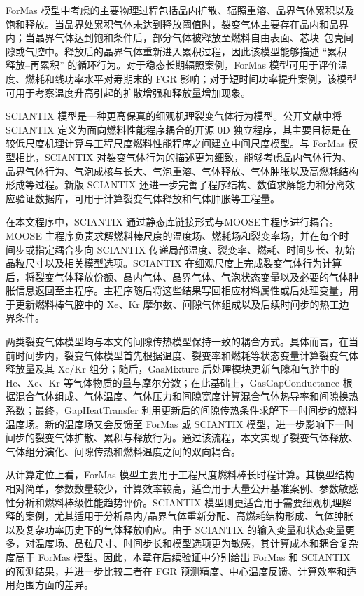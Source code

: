 ForMas 模型中考虑的主要物理过程包括晶内扩散、辐照重溶、晶界气体累积以及饱和释放。当晶界处累积气体未达到释放阈值时，裂变气体主要存在晶内和晶界内；当晶界气体达到饱和条件后，部分气体被释放至燃料自由表面、芯块--包壳间隙或气腔中。释放后的晶界气体重新进入累积过程，因此该模型能够描述 ``累积--释放--再累积'' 的循环行为。对于稳态长期辐照案例，ForMas 模型可用于评价温度、燃耗和线功率水平对寿期末的 FGR 影响；对于短时间功率提升案例，该模型可用于考察温度升高引起的扩散增强和释放量增加现象。

SCIANTIX 模型是一种更高保真的细观机理裂变气体行为模型。公开文献中将 SCIANTIX 定义为面向燃料性能程序耦合的开源 0D 独立程序，其主要目标是在较低尺度机理计算与工程尺度燃料性能程序之间建立中间尺度模型。与 ForMas 模型相比，SCIANTIX 对裂变气体行为的描述更为细致，能够考虑晶内气体行为、晶界气体行为、气泡成核与长大、气泡重溶、气体释放、气体肿胀以及高燃耗结构形成等过程。新版 SCIANTIX 还进一步完善了程序结构、数值求解能力和分离效应验证数据库，可用于计算裂变气体释放和气体肿胀等工程量。

在本文程序中，SCIANTIX 通过静态库链接形式与MOOSE主程序进行耦合。MOOSE 主程序负责求解燃料棒尺度的温度场、燃耗场和裂变率场，并在每个时间步或指定耦合步向 SCIANTIX 传递局部温度、裂变率、燃耗、时间步长、初始晶粒尺寸以及相关模型选项。SCIANTIX 在细观尺度上完成裂变气体行为计算后，将裂变气体释放份额、晶内气体、晶界气体、气泡状态变量以及必要的气体肿胀信息返回至主程序。主程序随后将这些结果写回相应材料属性或后处理变量，用于更新燃料棒气腔中的 Xe、Kr 摩尔数、间隙气体组成以及后续时间步的热工边界条件。

两类裂变气体模型均与本文的间隙传热模型保持一致的耦合方式。具体而言，在当前时间步内，裂变气体模型首先根据温度、裂变率和燃耗等状态变量计算裂变气体释放量及其 Xe/Kr 组分；随后，GasMixture 后处理模块更新气隙和气腔中的 He、Xe、Kr 等气体物质的量与摩尔分数；在此基础上，GasGapConductance 根据混合气体组成、气体温度、气体压力和间隙宽度计算混合气体热导率和间隙换热系数；最终，GapHeatTransfer 利用更新后的间隙传热条件求解下一时间步的燃料温度场。新的温度场又会反馈至 ForMas 或 SCIANTIX 模型，进一步影响下一时间步的裂变气体扩散、累积与释放行为。通过该流程，本文实现了裂变气体释放、气体组分演化、间隙传热和燃料温度之间的双向耦合。

从计算定位上看，ForMas 模型主要用于工程尺度燃料棒长时程计算。其模型结构相对简单，参数数量较少，计算效率较高，适合用于大量公开基准案例、参数敏感性分析和燃料棒级性能趋势评价。SCIANTIX 模型则更适合用于需要细观机理解释的案例，尤其适用于分析晶内/晶界气体重新分配、高燃耗结构形成、气体肿胀以及复杂功率历史下的气体释放响应。由于 SCIANTIX 的输入变量和状态变量更多，对温度场、晶粒尺寸、时间步长和模型选项更为敏感，其计算成本和耦合复杂度高于 ForMas 模型。因此，本章在后续验证中分别给出 ForMas 和 SCIANTIX 的预测结果，并进一步比较二者在 FGR 预测精度、中心温度反馈、计算效率和适用范围方面的差异。

